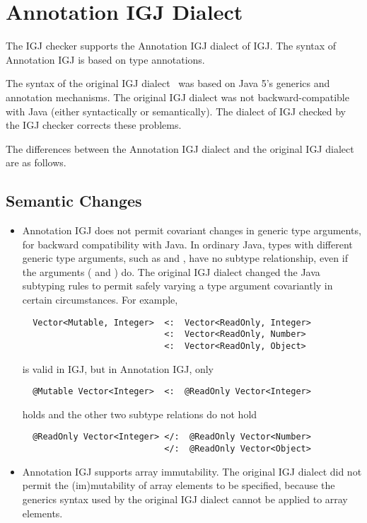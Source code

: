 \section{Annotation IGJ Dialect\label{annotation-igj-dialect}}

The IGJ checker supports the Annotation IGJ dialect of IGJ\@.  The syntax of
Annotation IGJ is based on type annotations.

The syntax of the original IGJ
dialect~\cite{ZibinPAAKE2007} was based on Java 5's generics and annotation mechanisms. The original
IGJ dialect was not backward-compatible with Java (either syntactically or
semantically). The dialect of IGJ checked by the IGJ checker corrects these
problems.

The differences between the Annotation IGJ dialect and the original IGJ dialect
are as follows.

\subsection{Semantic Changes}

\begin{itemize}

\item
  Annotation IGJ does not permit covariant changes in generic type
  arguments, for backward compatibility with Java.  In ordinary Java, types
  with different generic type arguments, such as  and
  , have no subtype relationship, even if the
  arguments ( and ) do. The original IGJ dialect
  changed the Java subtyping rules to permit safely varying a type argument
  covariantly in certain circumstances. For example,

\begin{Verbatim}
  Vector<Mutable, Integer>  <:  Vector<ReadOnly, Integer>
                            <:  Vector<ReadOnly, Number>
                            <:  Vector<ReadOnly, Object>
\end{Verbatim}

is valid in IGJ, but in Annotation IGJ, only

\begin{Verbatim}
  @Mutable Vector<Integer>  <:  @ReadOnly Vector<Integer>
\end{Verbatim}

holds and the other two subtype relations do not hold

\begin{Verbatim}
  @ReadOnly Vector<Integer> </:  @ReadOnly Vector<Number>
                            </:  @ReadOnly Vector<Object>
\end{Verbatim}


\item
  Annotation IGJ supports array immutability. The original IGJ dialect did
  not permit the (im)mutability of array elements to be specified, because
  the generics syntax used by the original IGJ dialect cannot be applied to
  array elements.

\end{itemize}

